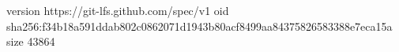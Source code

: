 version https://git-lfs.github.com/spec/v1
oid sha256:f34b18a591ddab802c0862071d1943b80acf8499aa84375826583388e7eca15a
size 43864
